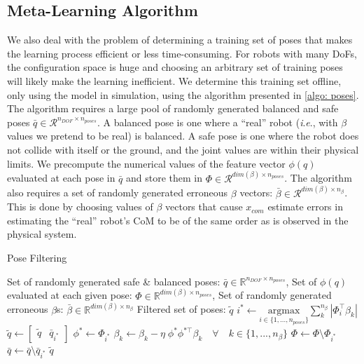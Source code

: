 \documentclass[letterpaper, 10 pt, conference]{ieeeconf}  %
\newcommand{\ie}{\textit{i}.\textit{e}., }
\begin{document}
\subsection{Meta-Learning Algorithm} \label{subsec: meta-learning}

We also deal with the problem of determining a training set of poses that makes the learning process efficient or less time-consuming. For robots with many \aclp{DoF}, the configuration space is huge and choosing an arbitrary set of training poses will likely make the learning inefficient. We determine this training set offline, only using the model in simulation, using the algorithm presented in \cref{algo: poses}. The algorithm requires a large pool of randomly  generated balanced and safe poses $\bar{q} \in \mathcal{R}^{n_{DOF} \times n_{poses}}$. A balanced pose is one where a ``real'' robot (\ie with $\beta$ values we pretend to be real) is balanced. A safe pose is one where the robot does not collide with itself or the ground, and the joint values are within their physical limits. We precompute the numerical values of the feature vector $\phi(q)$ evaluated at each pose in $\bar{q}$ and store them in $\Phi \in \mathcal{R}^{dim(\beta) \times n_{poses}}$. The algorithm also requires a set of randomly generated erroneous $\beta$ vectors: $\bar\beta \in \mathcal{R}^{dim(\beta) \times n_{\beta}}$. This is done by choosing values of $\beta$ vectors that cause $x_{com}$ estimate errors in estimating the ``real'' robot's \ac{CoM} to be of the same order as is observed in the physical system.
\begin{algorithm}
    \caption{Pose Filtering}
    \begin{algorithmic}[1]
        \renewcommand{\algorithmicrequire}{\textbf{Input:}}
        \renewcommand{\algorithmicensure}{\textbf{Output:}}
        \REQUIRE Set of randomly generated safe \& balanced poses: $\bar{q} \in
        \mathbb{R}^{n_{DOF} \times n_{poses}}$,
        \newline Set of $\phi(q)$ evaluated at each given pose: $\Phi \in
        \mathbb{R}^{dim(\beta) \times n_{poses}}$,
        \newline Set of randomly generated erroneous $\beta$s: $\bar{\beta} \in \mathbb{R}^{dim(\beta)
        \times n_{\beta}}$
        \ENSURE Filtered set of poses: $\widetilde{q}$
        \REPEAT
        \STATE $i^* \leftarrow \underset{i \in \{1, ..., n_{poses}\}}{\mathrm{argmax}}
        \sum_{k}^{n_{\beta}} | \Phi_i^\top \beta_k |$
        \STATE $\widetilde{q} \leftarrow [\begin{matrix} \widetilde{q} &
        \bar{q}_{i^*} \end{matrix}] $
        \STATE $\phi^* \leftarrow \Phi_{i^{*}}$
        \STATE $\beta_k \leftarrow \beta_k - \eta \; \phi^* \phi^{*\top} \beta_k \quad \forall \quad k \in \{1, ..., n_\beta \}$
        \STATE $\Phi \leftarrow  \Phi \setminus \Phi_{i^*} $
        \STATE $\bar{q} \leftarrow \bar{q} \setminus \bar{q}_{i^*} $
        \RETURN $\widetilde{q}$
    \end{algorithmic}
    \label{algo: poses}
\end{algorithm}
\end{document}
